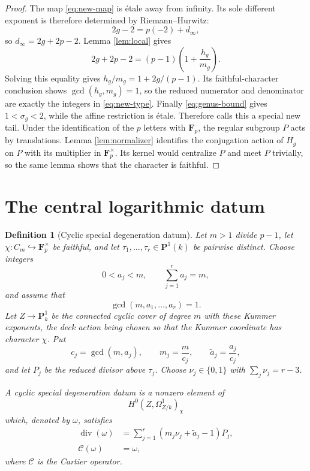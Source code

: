\documentclass[10pt,a4paper]{amsart}
\newtheorem{definition}[theorem]{Definition}
\numberwithin{equation}{section}
\begin{document}
\begin{proof}
The map \eqref{eq:new-map} is \'etale away from infinity.  Its sole different
exponent is therefore determined by Riemann--Hurwitz:
\[
 2g-2=p(-2)+d_\infty,
\]
so $d_\infty=2g+2p-2$.  Lemma \ref{lem:local} gives
\[
 2g+2p-2=(p-1)\left(1+\frac{h_g}{m_g}\right).
\]
Solving this equality gives
$h_g/m_g=1+2g/(p-1)$.  Its faithful-character conclusion shows
$\gcd(h_g,m_g)=1$, so the reduced numerator and denominator are exactly the
integers in \eqref{eq:new-type}.  Finally \eqref{eq:genus-bound} gives
$1<\sigma_g<2$, while the
affine restriction is étale.
Therefore \cite[Definition 2.10]{WewersThree} calls this a special new tail.
Under the identification of the $p$ letters with $\mathbf F_p$, the regular
subgroup $P$ acts by translations.  Lemma \ref{lem:normalizer} identifies
the conjugation action of $H_g$ on $P$ with its multiplier in
$\mathbf F_p^\times$.  Its kernel would centralize $P$ and meet $P$
trivially, so the same lemma shows that the character is faithful.
\end{proof}

\section{The central logarithmic datum}

\begin{definition}[Cyclic special degeneration datum]
\label{def:cyclic-degeneration}
Let $m>1$ divide $p-1$, let
$\chi:C_m\hookrightarrow\mathbf F_p^\times$ be faithful, and let
$\tau_1,\ldots,\tau_r\in\mathbf P^1(k)$ be pairwise distinct.  Choose
integers
\[
 0<a_j<m,\qquad \sum_{j=1}^r a_j=m,
\]
and assume that
\[
 \gcd(m,a_1,\ldots,a_r)=1.
\]
Let $Z\to\mathbf P^1_k$ be the connected cyclic cover of degree $m$
with these Kummer exponents, the deck action being chosen so that the
Kummer coordinate has character $\chi$.  Put
\[
 c_j=\gcd(m,a_j),\qquad m_j=\frac{m}{c_j},\qquad
 \widetilde a_j=\frac{a_j}{c_j},
\]
and let $P_j$ be the reduced divisor above $\tau_j$.  Choose
$\nu_j\in\{0,1\}$ with $\sum_j\nu_j=r-3$.

A cyclic special degeneration datum is a nonzero element of
\[
 H^0(Z,\Omega^1_{Z/k})_\chi
\]
which, denoted by $\omega$, satisfies
\begin{align}
 \operatorname{div}(\omega)
 &=\sum_{j=1}^r(m_j\nu_j+\widetilde a_j-1)P_j,
 \label{eq:degeneration-divisor}\\
 \mathcal C(\omega)&=\omega,
 \label{eq:degeneration-cartier}
\end{align}
where $\mathcal C$ is the Cartier operator.
\end{definition}
\end{document}
